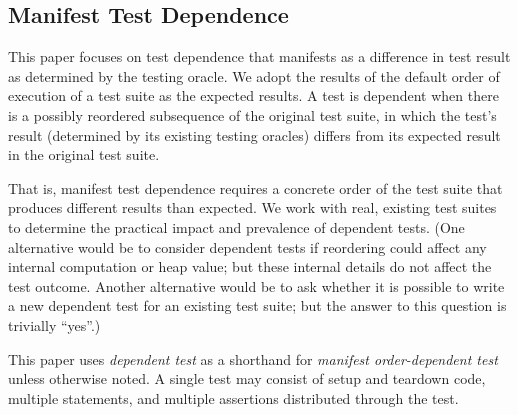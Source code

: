 
\subsection{Manifest Test Dependence}

This paper focuses on test
dependence that manifests as a
difference in test result as determined by the testing oracle.
We adopt the results of the default
order of execution of a test suite as the
expected results. A test is dependent when there is a possibly
reordered subsequence of the original test suite, in which
the test's result (determined by its existing testing
oracles) differs from its expected result in the
original test suite.

That is, manifest test dependence
requires a concrete order of the test suite that
produces {different} results than expected.  
%
We work with real, existing test suites to determine the practical impact
and prevalence of dependent tests.
%
(One alternative would be to consider dependent tests if reordering could
affect any internal computation or heap value; but these internal details
do not affect the test outcome.  Another alternative would be to ask
whether it is possible to write a new dependent test for an existing
test suite; but the answer to this question is trivially ``yes''.)


This paper uses \textit{dependent test} as a shorthand for
\textit{manifest order-dependent test}
unless otherwise noted.
%
A single test may consist of setup and teardown
code, multiple statements, and multiple assertions
distributed
through the test.






